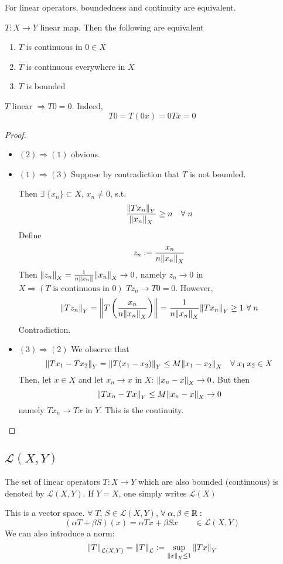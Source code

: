 For linear operators, boundedness and continuity are equivalent.
\begin{theorem}
    \(T:X \to Y\) linear map. Then the following are equivalent
    \begin{enumerate}
        \item \(T\) is continuous in \(0 \in X\)
        \item \(T\) is continuous everywhere in \(X\)
        \item \(T\) is bounded
    \end{enumerate}
\end{theorem}
\begin{remark}
    \(T\) linear \(\Rightarrow T0 = 0\). Indeed,
    \[
        T0 = T(0x) =  0 Tx = 0
    \]
\end{remark}
\begin{proof}
    
    \begin{itemize}
        \item \((2) \Rightarrow (1)\) obvious.
        \item \((1) \Rightarrow (3)\) Suppose by contradiction that \(T\) is not bounded. 
        
        Then \(\exists \; \{ x_n \} \subset X \), \(x_n \neq 0\), s.t. 
        \[
            \frac{\norm{T x_n}_Y}{\norm{x_n}_X} \geq n \quad \forall\; n
        \]
        Define
        \[
            z_n := \frac{x_n}{n \norm{x_n}_X}
        \]
        Then \(\norm{z_n }_X = \frac{1}{n \norm{x_n}} \norm{x_n}_X \to 0\),
        namely \(z_n \to 0 \) in \( X \Rightarrow (T \text{ is continuous in }0)\) \(T z_n \to T0 =0\).
        However, 
        \[
            \norm{T z_n}_Y = \norm{T\left(\frac{x_n}{n \norm{x_n}_X}\right)} = \frac{1}{n \norm{x_n}_X} \norm{T x_n}_Y \geq 1 \ \forall\; n
        \]
        Contradiction.
        \item \((3) \Rightarrow (2)\) 
        We observe that 
        \[
            \norm{Tx_1 - Tx_2}_Y = \norm{T(x_1 - x_2)}_Y \leq M \norm{x_1 - x_2}_X  \quad \forall \; x_1 \, x_2 \in X
        \]
        Then, let \(x \in X \) and let \(x_n \to x\) in \(X\): \(\norm{x_n - x}_X \to 0\). But then
        \[
            \norm{T x_n - Tx}_Y \leq M \norm{x_n - x}_X \to 0
        \]
        namely \(Tx_n \to Tx \) in \(Y\). This is the continuity.
    \end{itemize}
\end{proof}
\subsection{\texorpdfstring{\(\mathcal{L}(X,Y)\)}{L(X,Y)}}
\begin{definition}
    The set of linear operators \(T : X \to Y\) which are also bounded (continuous) is denoted by \(\mathcal{L}(X, Y)\).    If \(Y=X\), one simply writes \(\mathcal{L}(X)\)
\end{definition}
This is a vector space. \( \forall\; T,\, S \in \mathcal{L}(X, Y) \), \(\forall\; \alpha, \beta \in \mathbb{R}:\)
\[
     (\alpha T + \beta S)(x) = \alpha Tx + \beta Sx \qquad \in \mathcal{L}(X, Y)
\]
We can also introduce a norm:
\[
    \norm{T}_{\mathcal{L}(X, Y)} = \norm{T}_\mathcal{L} := \sup_{\norm{x}_X \leq 1} \norm{Tx}_Y
\]


